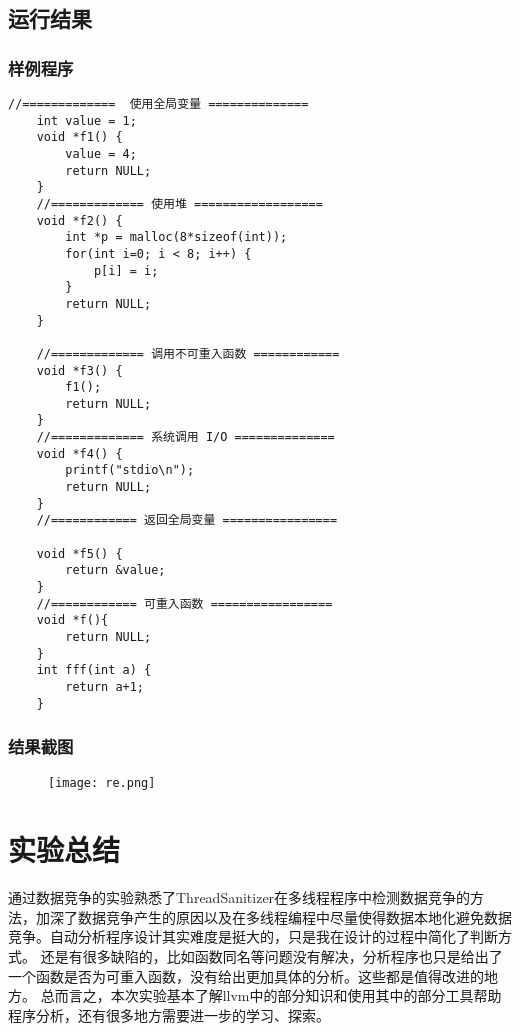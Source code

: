\documentclass[UTF8]{ctexart}
\begin{document}
\subsection{运行结果}
\subsubsection{样例程序}
\begin{lstlisting}[frame=shadowbox, rulesepcolor=\color{red!20!green!20!blue!20}] 
    //=============  使用全局变量 ==============
    int value = 1;
    void *f1() {
        value = 4;
        return NULL;
    }
    //============= 使用堆 ==================
    void *f2() {
        int *p = malloc(8*sizeof(int));
        for(int i=0; i < 8; i++) {
            p[i] = i;
        }
        return NULL;
    }

    //============= 调用不可重入函数 ============
    void *f3() {
        f1();
        return NULL;
    }
    //============= 系统调用 I/O ==============
    void *f4() {
        printf("stdio\n");
        return NULL;
    }
    //============ 返回全局变量 ================
    
    void *f5() {
        return &value;
    }
    //============ 可重入函数 =================
    void *f(){
        return NULL;
    }
    int fff(int a) {
        return a+1;
    }
\end{lstlisting}
\subsubsection{结果截图}
\begin{figure}[h]
    \centering
    \texttt{[image: re.png]}
\end{figure}
\section{实验总结}
通过数据竞争的实验熟悉了ThreadSanitizer在多线程程序中检测数据竞争的方法，加深了数据竞争产生的原因以及在多线程编程中尽量使得数据本地化避免数据竞争。自动分析程序设计其实难度是挺大的，只是我在设计的过程中简化了判断方式。
还是有很多缺陷的，比如函数同名等问题没有解决，分析程序也只是给出了一个函数是否为可重入函数，没有给出更加具体的分析。这些都是值得改进的地方。
总而言之，本次实验基本了解llvm中的部分知识和使用其中的部分工具帮助程序分析，还有很多地方需要进一步的学习、探索。
\end{document}
